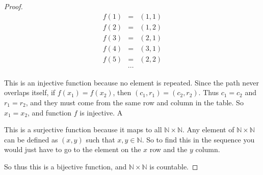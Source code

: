\documentclass{article}
\begin{document}
\begin{proof}
    \begin{eqnarray*}
        f(1)&=&(1,1)\\
        f(2)&=&(1,2)\\
        f(3)&=&(2,1)\\
        f(4)&=&(3,1)\\
        f(5)&=&(2,2)\\
        &\cdots&
    \end{eqnarray*}
    
    This is an injective function because no element is repeated. Since the path never overlaps itself, if  $f(x_1) = f(x_2)$, then  $(c_1,r_1) = (c_2,r_2)$. Thus $c_1 = c_2$ and $r_1=r_2$, and they must come from the same row and column in the table. So $x_1 = x_2$, and function $f$ is injective.  A
    
    This is a surjective function because it maps to all $\mathbb{N}\times\mathbb{N}$. Any element of $\mathbb{N}\times\mathbb{N}$ can be defined as $(x,y)$ such that $x,y\in\mathbb{N}$. So to find this in the sequence you would just have to go to the element on the $x$ row and the $y$ column.
    
    So thus this is a bijective function, and $\mathbb{N}\times\mathbb{N}$ is countable.
\end{proof}

\pagebreak
\end{document}
